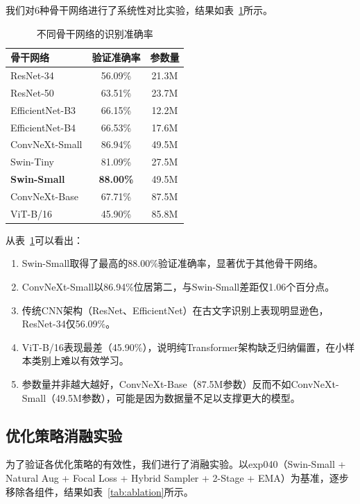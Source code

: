 \documentclass[12pt,a4paper]{article}
\begin{document}
我们对6种骨干网络进行了系统性对比实验，结果如表~\ref{tab:backbone}所示。

\begin{table}[H]
\centering
\caption{不同骨干网络的识别准确率}
\label{tab:backbone}
\begin{tabular}{lcc}
\toprule
\textbf{骨干网络} & \textbf{验证准确率} & \textbf{参数量} \\
\midrule
ResNet-34 & 56.09\% & 21.3M \\
ResNet-50 & 63.51\% & 23.7M \\
EfficientNet-B3 & 66.15\% & 12.2M \\
EfficientNet-B4 & 66.53\% & 17.6M \\
ConvNeXt-Small & 86.94\% & 49.5M \\
Swin-Tiny & 81.09\% & 27.5M \\
\textbf{Swin-Small} & \textbf{88.00\%} & 49.5M \\
ConvNeXt-Base & 67.71\% & 87.5M \\
ViT-B/16 & 45.90\% & 85.8M \\
\bottomrule
\end{tabular}
\end{table}

从表~\ref{tab:backbone}可以看出：
\begin{enumerate}
    \item Swin-Small取得了最高的88.00\%验证准确率，显著优于其他骨干网络。
    \item ConvNeXt-Small以86.94\%位居第二，与Swin-Small差距仅1.06个百分点。
    \item 传统CNN架构（ResNet、EfficientNet）在古文字识别上表现明显逊色，ResNet-34仅56.09\%。
    \item ViT-B/16表现最差（45.90\%），说明纯Transformer架构缺乏归纳偏置，在小样本类别上难以有效学习。
    \item 参数量并非越大越好，ConvNeXt-Base（87.5M参数）反而不如ConvNeXt-Small（49.5M参数），可能是因为数据量不足以支撑更大的模型。
\end{enumerate}

\subsection{优化策略消融实验}

为了验证各优化策略的有效性，我们进行了消融实验。以exp040（Swin-Small + Natural Aug + Focal Loss + Hybrid Sampler + 2-Stage + EMA）为基准，逐步移除各组件，结果如表~\ref{tab:ablation}所示。
\end{document}
